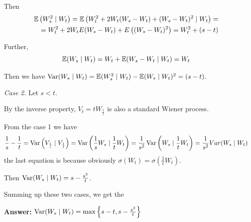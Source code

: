\documentclass[12pt, a4paper]{article}
\begin{document}
Then
\begin{align*}
  \operatorname{\mathbb{E}}\left( W_{s}^{2} \mid  W_{t}\right) = \operatorname{\mathbb{E}}\left( W_{t}^{2} + 2 W_{t}(W_{s} - W_{t}) + (W_{s} - W_{t})^{2} \mid W_{t}\right) =\\  
  = W_{t}^{2} + 2W_{t}E(W_{s} - W_{t}) + E\left((W_{s} - W_{t})^{2}\right) = W_{t}^{2} + (s-t)
\end{align*}

Further,
\[
\operatorname{\mathbb{E}}(W_{s} \mid W_{t}) = W_{t} + \operatorname{\mathbb{E}}(W_{s} - W_{t} \mid W_{t}) = W_{t}
\]

Then we have $\operatorname{Var}(W_{s} \mid W_{t}) = \operatorname{\mathbb{E}}(W_{s}^{2} \mid W_{t}) - \operatorname{\mathbb{E}}(W_{s} \mid W_{t})^{2} = (s-t)$.


\textit{Case 2.} Let $s < t$.\par
By the inverse property, $V_{t} = tW_{\frac{1}{t}}$ is also a standard Wiener process.\par
From the case 1 we have
\[
\frac{ 1}{ s} - \frac{ 1}{ t} = \operatorname{Var}\left(V_{\frac{1}{s}} \mid V_{\frac{1}{t}}\right) = \operatorname{Var}\left(\frac{ 1}{ s}W_{s} \mid \frac{ 1}{ t}W_{t}\right) = \frac{ 1}{ s^{2}} \operatorname{Var}\left(W_{s} \mid \frac{ 1}{ t} W_{t}\right) = \frac{ 1}{ s^{2}}Var(W_{s} \mid W_{t})
\]
the last equation is because obviously $\sigma(W_{t}) = \sigma\left(\frac{ 1}{ t}W_{t}\right)$.\par
Then $\operatorname{Var}(W_{s} \mid W_{t}) = s - \frac{ s^{2}}{ t}$.\[\]\par
Summing up these two cases, we get the\[\]\par
\textbf{Answer:} $\operatorname{Var}(W_{s} \mid W_{t}) = \max\left\{s-t, s - \frac{ s^{2}}{ t}\right\}$
\end{document}
